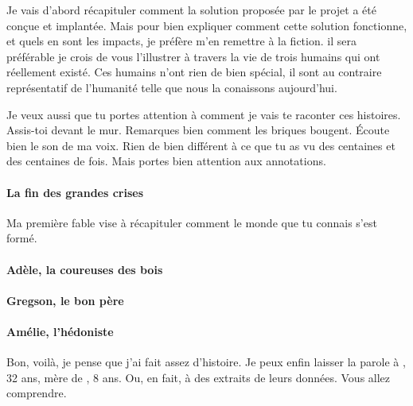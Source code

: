 Je vais d'abord récapituler comment la solution proposée par le projet
\nomProjet{} a été conçue et implantée.  Mais pour bien expliquer comment cette
solution fonctionne, et quels en sont les impacts, je préfère m'en remettre à
la fiction.  il sera préférable je crois de vous l'illustrer à travers la vie
de trois humains qui ont réellement existé. Ces humains n'ont rien de bien
spécial, il sont au contraire représentatif de l'humanité telle que nous la
conaissons aujourd'hui.

Je veux aussi que tu portes attention à comment je vais te raconter ces histoires.
Assis-toi devant le mur. Remarques bien comment les briques bougent.
Écoute bien le son de ma voix.
Rien de bien différent à ce que tu as vu des centaines et des centaines de fois.
Mais portes bien attention aux annotations.

\paragraph{La fin des grandes crises}

Ma première fable vise à récapituler comment le monde que tu connais s'est formé.


\paragraph{Adèle, la coureuses des bois}

\paragraph{Gregson, le bon père} 

\paragraph{Amélie, l'hédoniste}

Bon, voilà, je pense que j'ai fait assez d'histoire. Je peux enfin laisser la
parole à \nomMere, 32 ans, mère de \nomEnfant, 8 ans. Ou, en fait, à des
extraits de leurs données. Vous allez comprendre.


